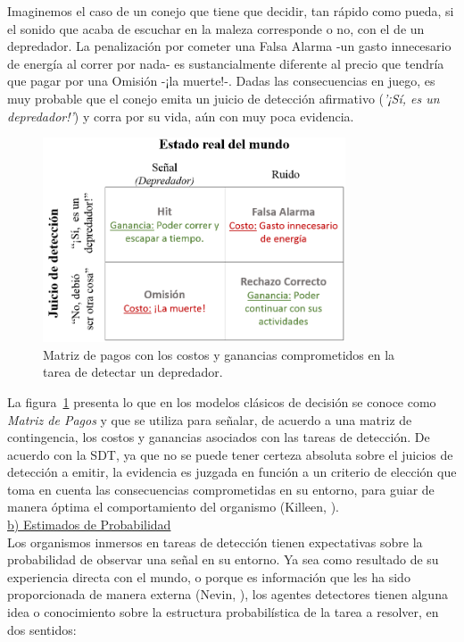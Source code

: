 Imaginemos el caso de un conejo que tiene que decidir, tan rápido como pueda, si el sonido que acaba de escuchar en la maleza corresponde o no, con el de un depredador. La penalización por cometer una Falsa Alarma -un gasto innecesario de energía al correr por nada- es sustancialmente diferente al precio que tendría que pagar por una Omisión -¡la muerte!-. Dadas las consecuencias en juego, es muy probable que el conejo emita un juicio de detección afirmativo (\textit{'¡Sí, es un depredador!'}) y corra por su vida, aún con muy poca evidencia.\\

\begin{figure}[h]
\centering
\includegraphics[width=0.80\textwidth]{Figures/Matriz_Pagos} 
\caption[Matriz de Pagos: Consecuencias comprometidas en una tarea de detección hipotética (ejemplo)]{Matriz de pagos con los costos y ganancias comprometidos en la tarea de detectar un depredador.}
\label{fig:Mat_Pagos}
\end{figure}

La figura~\ref{fig:Mat_Pagos} presenta lo que en los modelos clásicos de decisión se conoce como \textit{Matriz de Pagos} y que se utiliza para señalar, de acuerdo a una matriz de contingencia, los costos y ganancias asociados con las tareas de detección. De acuerdo con la SDT, ya que no se puede tener certeza absoluta sobre el juicios de detección a emitir, la evidencia es juzgada en función a un criterio de elección que toma en cuenta las consecuencias comprometidas en su entorno, para guiar de manera óptima el comportamiento del organismo (Killeen, \citeyear{Killeen2014}).\\

      \underline{b) Estimados de Probabilidad}\\

Los organismos inmersos en tareas de detección tienen expectativas sobre la probabilidad de observar una señal en su entorno. Ya sea como resultado de su experiencia directa con el mundo, o porque es información que les ha sido proporcionada de manera externa (Nevin, \citeyear{Nevin1969}), los agentes detectores tienen alguna idea o conocimiento sobre la estructura probabilística de la tarea a resolver, en dos sentidos: 

